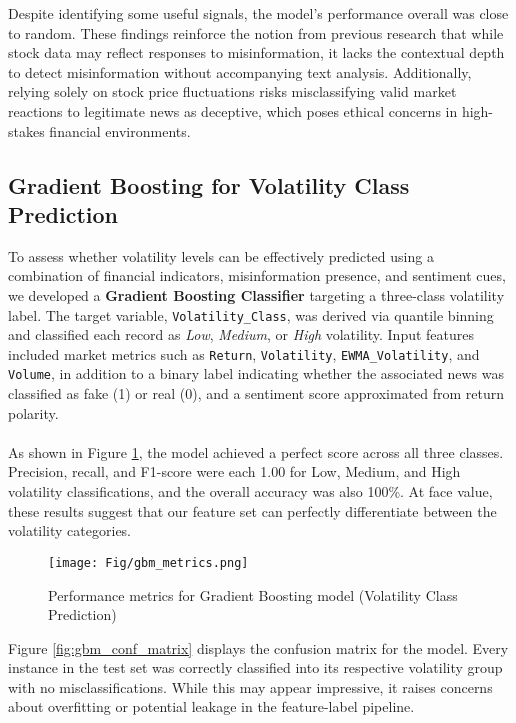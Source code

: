 \documentclass{article}
\begin{document}
Despite identifying some useful signals, the model’s performance overall was close to random. These findings reinforce the notion from previous research that while stock data may reflect responses to misinformation, it lacks the contextual depth to detect misinformation without accompanying text analysis. Additionally, relying solely on stock price fluctuations risks misclassifying valid market reactions to legitimate news as deceptive, which poses ethical concerns in high-stakes financial environments.

\subsection{Gradient Boosting for Volatility Class Prediction}

To assess whether volatility levels can be effectively predicted using a combination of financial indicators, misinformation presence, and sentiment cues, we developed a \textbf{Gradient Boosting Classifier} targeting a three-class volatility label. The target variable, \texttt{Volatility\_Class}, was derived via quantile binning and classified each record as \textit{Low}, \textit{Medium}, or \textit{High} volatility. Input features included market metrics such as \texttt{Return}, \texttt{Volatility}, \texttt{EWMA\_Volatility}, and \texttt{Volume}, in addition to a binary label indicating whether the associated news was classified as fake (1) or real (0), and a sentiment score approximated from return polarity.
\\\\
As shown in Figure \ref{fig:gbm_metrics}, the model achieved a perfect score across all three classes. Precision, recall, and F1-score were each 1.00 for Low, Medium, and High volatility classifications, and the overall accuracy was also 100\%. At face value, these results suggest that our feature set can perfectly differentiate between the volatility categories.

\begin{figure}[H]
    \centering
    \texttt{[image: Fig/gbm\_metrics.png]}
    \caption{Performance metrics for Gradient Boosting model (Volatility Class Prediction)}
    \label{fig:gbm_metrics}
\end{figure}

Figure \ref{fig:gbm_conf_matrix} displays the confusion matrix for the model. Every instance in the test set was correctly classified into its respective volatility group with no misclassifications. While this may appear impressive, it raises concerns about overfitting or potential leakage in the feature-label pipeline.
\end{document}
